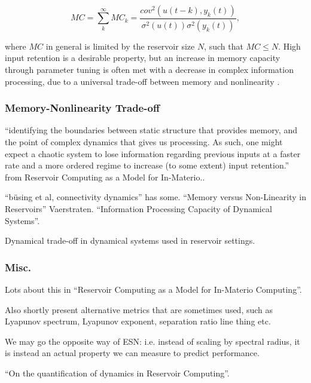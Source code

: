 \begin{equation}
  MC =
  \sum_{k}^{\infty}MC_{k} =
  \frac
  {cov^2(u(t-k), y_k(t))}
  {\sigma^{2}(u(t))\sigma^{2}(y_{k}(t))}
  ,
  \label{stm-eq}
\end{equation}

where $MC$ in general is limited by the reservoir size $N$, such that $MC \leq
N$. High input retention is a desirable property, but an increase in memory
capacity through parameter tuning is often met with a decrease in complex
information processing, due to a universal trade-off between memory and
nonlinearity \cite{dambre_information_2012}.


\subsubsection{Memory-Nonlinearity Trade-off}

``identifying the boundaries between static structure that provides memory, and
the point of complex dynamics that gives us processing. As such, one might
expect a chaotic system to lose information regarding previous inputs at a
faster rate and a more ordered regime to increase (to some extent) input
retention.'' from Reservoir Computing as a Model for In-Materio..

``büsing et al, connectivity dynamics'' has some.
``Memory versus Non-Linearity in Reservoirs'' Vaerstraten.
``Information Processing Capacity of Dynamical Systems''.

Dynamical trade-off in dynamical systems used in reservoir settings.

\subsubsection{Misc.}

Lots about this in ``Reservoir Computing as a Model for In-Materio Computing''.

Also shortly present alternative metrics that are sometimes used, such as
Lyapunov spectrum, Lyapunov exponent, separation ratio line thing etc.

We may go the opposite way of ESN: i.e. instead of scaling by spectral radius,
it is instead an actual property we can measure to predict performance.

``On the quantification of dynamics in Reservoir Computing''.

